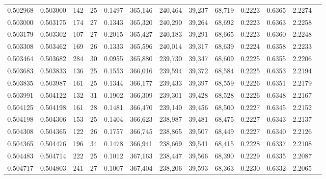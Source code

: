 \begin{tabular}{rrrrrrrrrrrrr}
0.502968 & 0.503000 &   142 &  25 &                                     0.1497 & 365,146 & 240,464 &  39,237 &  68,719 & 0.2223 & 0.6365 & 2.2274 \\
0.503000 & 0.503175 &   174 &  27 &                                     0.1343 & 365,320 & 240,290 &  39,264 &  68,692 & 0.2223 & 0.6363 & 2.2258 \\
0.503179 & 0.503302 &   107 &  27 &                                     0.2015 & 365,427 & 240,183 &  39,291 &  68,665 & 0.2223 & 0.6360 & 2.2248 \\
0.503308 & 0.503462 &   169 &  26 &                                     0.1333 & 365,596 & 240,014 &  39,317 &  68,639 & 0.2224 & 0.6358 & 2.2233 \\
0.503464 & 0.503682 &   284 &  30 &                                     0.0955 & 365,880 & 239,730 &  39,347 &  68,609 & 0.2225 & 0.6355 & 2.2206 \\
0.503683 & 0.503833 &   136 &  25 &                                     0.1553 & 366,016 & 239,594 &  39,372 &  68,584 & 0.2225 & 0.6353 & 2.2194 \\
0.503835 & 0.503987 &   161 &  25 &                                     0.1344 & 366,177 & 239,433 &  39,397 &  68,559 & 0.2226 & 0.6351 & 2.2179 \\
0.503991 & 0.504122 &   132 &  31 &                                     0.1902 & 366,309 & 239,301 &  39,428 &  68,528 & 0.2226 & 0.6348 & 2.2167 \\
0.504125 & 0.504198 &   161 &  28 &                                     0.1481 & 366,470 & 239,140 &  39,456 &  68,500 & 0.2227 & 0.6345 & 2.2152 \\
0.504198 & 0.504306 &   153 &  25 &                                     0.1404 & 366,623 & 238,987 &  39,481 &  68,475 & 0.2227 & 0.6343 & 2.2137 \\
0.504308 & 0.504365 &   122 &  26 &                                     0.1757 & 366,745 & 238,865 &  39,507 &  68,449 & 0.2227 & 0.6340 & 2.2126 \\
0.504365 & 0.504476 &   196 &  34 &                                     0.1478 & 366,941 & 238,669 &  39,541 &  68,415 & 0.2228 & 0.6337 & 2.2108 \\
0.504483 & 0.504714 &   222 &  25 &                                     0.1012 & 367,163 & 238,447 &  39,566 &  68,390 & 0.2229 & 0.6335 & 2.2087 \\
0.504717 & 0.504803 &   241 &  27 &                                     0.1007 & 367,404 & 238,206 &  39,593 &  68,363 & 0.2230 & 0.6332 & 2.2065 \\

\end{tabular}
